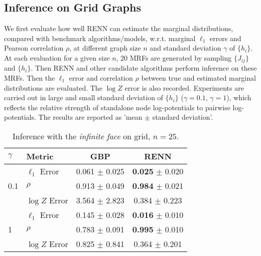 \subsection{Inference on Grid Graphs}

We first evaluate how well RENN can estimate the marginal distributions, compared with benchmark algorithms/models, w.r.t. marginal $\ell_1$ errors and Pearson correlation $\rho$, at different graph size $n$ and standard deviation $\gamma$ of $\{h_i\}$. At each evaluation for a given size $n$, $20$ MRFs are generated by sampling $\{J_{ij}\}$ and $\{h_i\}$. Then RENN and other candidate algorithms perform inference on these MRFs. Then the $\ell_1$ error and correlation $\rho$ between true and estimated marginal distributions are evaluated. The $\log{Z}$ error is also recorded.
Experiments are carried out in large and small standard deviation of $\{h_i\}$ ($\gamma=0.1$, $\gamma=1$), which reflects the relative strength of standalone node log-potentials to pairwise log-potentials. The results are reported as 'mean $\pm$ standard deviation'.

\begin{table}[tp!]
  \caption{Inference with the \textit{infinite face} on grid, $n=25$.}
  \label{tab:infer-infinite-face}
  \begin{center}
    \begin{small}
      
        \begin{tabular}{llcc}
          \toprule
          $\gamma$ & Metric & GBP & RENN \\
          \midrule
          \multirow{3}{*}{0.1}
                   & $\ell_1$ Error & 0.061 $\pm$ 0.025 & \textbf{0.025} $\pm$ 0.020 \\

                   & $\rho$   & 0.913 $\pm$ 0.049  &  \textbf{0.984} $\pm$ 0.021  \\
                   & $\log{Z}$ Error & 3.564 $\pm$ 2.823  &  0.384 $\pm$ 0.223  \\
          \midrule
          \multirow{3}{*}{1}
                   & $\ell_1$ Error & 0.145 $\pm$ 0.028  & \textbf{0.016} $\pm$ 0.010 \\

                   & $\rho$   & 0.783 $\pm$ 0.091  &  \textbf{0.995} $\pm$ 0.010 \\
                   & $\log{Z}$ Error & 0.825 $\pm$ 0.841  & 0.364 $\pm$ 0.201 \\
          
          \bottomrule
        \end{tabular}

    \end{small}
  \end{center}
\end{table}








